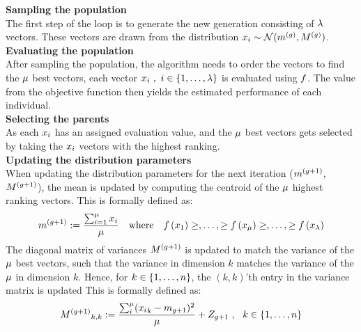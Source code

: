 \textbf{Sampling the population}\\
The first step of the loop is to generate the new generation 
consisting of $\lambda$ vectors. 
These vectors are drawn from the distribution 
$x_{i}\sim \mathcal{N}(m^{(g)},M^{(g)})$.
\\

\textbf{Evaluating the population}\\
After sampling the population, the algorithm needs to order the vectors to find the $\mu$ best vectors, each vector $x_{i}\ ,\ i \in \{1, \dots, \lambda\}$ is evaluated using $f$. 
The value from the objective function then yields 
the estimated performance of each individual.
\\

\textbf{Selecting the parents}\\
As each $x_{i}$ has an assigned evaluation value, and the 
$\mu$ best vectors gets selected by 
taking the $x_{i}$ vectors with the highest ranking.
\\

\textbf{Updating the distribution parameters}\\
When updating the distribution parameters for the next iteration
($m^{(g + 1)}$,$M^{(g + 1)}$), 
the mean is updated by computing the centroid of the 
$\mu$ highest ranking vectors. This is formally defined as:
\begin{align}
\mean^{(\generation +1)}:=\frac{\sum_{i=1}^{\offspringNumber} \individual_{i}}{\offspringNumber}
\ \ \ 
\text{where}
\ \ \ 
\fitnessFunction \left( \individual_{1} \right) \geq, \dots, 
\geq \fitnessFunction \left( \individual_{\offspringNumber} \right) \geq, 
\dots, \geq \fitnessFunction \left( \individual_{\populationSize} \right)
\end{align}
The diagonal matrix of variances $M^{(g + 1)}$ is updated 
to match the variance of the $\mu$ best
vectors, such that the variance in dimension $k$ 
matches the variance of the $\mu$
in dimension $k$. Hence, for $k \in \{ 1,\dots,n \}$,
the $(k,k)$'th entry in the variance matrix is 
updated 
This is formally defined as:
\begin{align}
{M^{(g+1)}}_{k,k}:=\frac{\sum_{i}^{\mu}
({x_{i}}_k - m_{g +1})^2}{\mu} + 
Z_{g + 1}\ ,\ \ k \in \{ 1,\dots,n \}
\end{align}